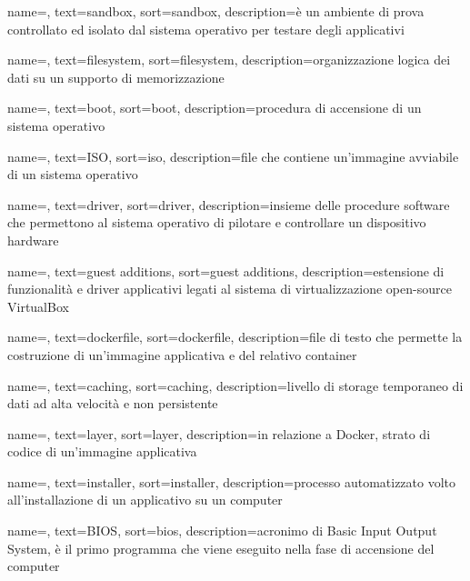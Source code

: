 {
    name=,
    text=sandbox,
    sort=sandbox, 
    description={è un ambiente di prova controllato ed isolato dal sistema operativo per testare degli applicativi}
}

{
    name=,
    text=filesystem,
    sort=filesystem, 
    description={organizzazione logica dei dati su un supporto di memorizzazione}
}

{
    name=,
    text=boot,
    sort=boot, 
    description={procedura di accensione di un sistema operativo}
}

{
    name=,
    text=ISO,
    sort=iso, 
    description={file che contiene un'immagine avviabile di un sistema operativo}
}

{
    name=,
    text=driver,
    sort=driver, 
    description={insieme delle procedure software che permettono al sistema operativo di pilotare e controllare un dispositivo hardware}
}

{
    name=,
    text=guest additions,
    sort=guest additions, 
    description={estensione di funzionalità e driver applicativi legati al sistema di virtualizzazione open-source VirtualBox}
}

{
    name=,
    text=dockerfile,
    sort=dockerfile, 
    description={file di testo che permette la costruzione di un'immagine applicativa e del relativo container}
}

{
    name=,
    text=caching,
    sort=caching, 
    description={livello di storage temporaneo di dati ad alta velocità e non persistente}
}

{
    name=,
    text=layer,
    sort=layer, 
    description={in relazione a Docker, strato di codice di un'immagine applicativa}
}

{
    name=,
    text=installer,
    sort=installer, 
    description={processo automatizzato volto all'installazione di un applicativo su un computer}
}

{
    name=,
    text=BIOS,
    sort=bios, 
    description={acronimo di Basic Input Output System, è il primo programma che viene eseguito nella fase di accensione del computer}
}

